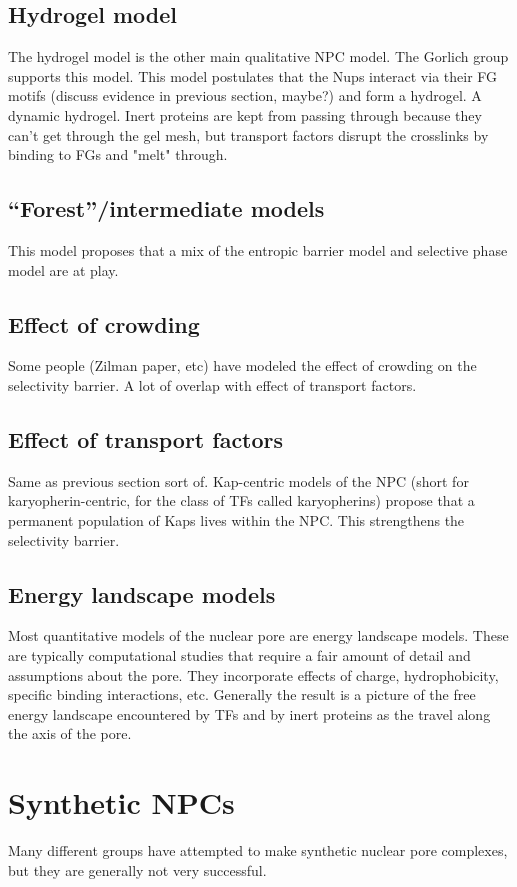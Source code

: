 \subsection{Hydrogel model}
The hydrogel model is the other main qualitative NPC model.  The Gorlich group supports this model.  This model postulates that the Nups interact via their FG motifs (discuss evidence in previous section, maybe?) and form a hydrogel.  A dynamic hydrogel.  Inert proteins are kept from passing through because they can't get through the gel mesh, but transport factors disrupt the crosslinks by binding to FGs and "melt" through.
\subsection{“Forest”/intermediate models}
This model proposes that a mix of the entropic barrier model and selective phase model are at play.
\subsection{Effect of crowding}
Some people (Zilman paper, etc) have modeled the effect of crowding on the selectivity barrier.  A lot of overlap with effect of transport factors.
\subsection{Effect of transport factors}
Same as previous section sort of.  Kap-centric models of the NPC (short for karyopherin-centric, for the class of TFs called karyopherins) propose that a permanent population of Kaps lives within the NPC.  This strengthens the selectivity barrier.
\subsection{Energy landscape models}
Most quantitative models of the nuclear pore are energy landscape models.  These are typically computational studies that require a fair amount of detail and assumptions about the pore.  They incorporate effects of charge, hydrophobicity, specific binding interactions, etc.  Generally the result is a picture of the free energy landscape encountered by TFs and by inert proteins as the travel along the axis of the pore.
\section{Synthetic NPCs}
Many different groups have attempted to make synthetic nuclear pore complexes, but they are generally not very successful.
